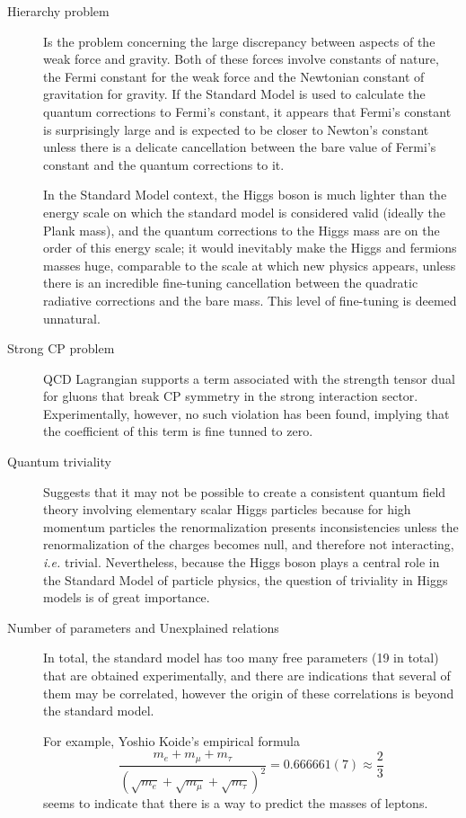 \begin{description}
	\item[Hierarchy problem] Is the problem concerning the large discrepancy between aspects of the weak force and gravity. Both of these forces involve constants of nature, the Fermi constant for the weak force and the Newtonian constant of gravitation for gravity. If the Standard Model is used to calculate the quantum corrections to Fermi's constant, it appears that Fermi's constant is surprisingly large and is expected to be closer to Newton's constant unless there is a delicate cancellation between the bare value of Fermi's constant and the quantum corrections to it. 
	
	In the Standard Model context, the Higgs boson is much lighter than the energy scale on which the standard model is considered valid (ideally the Plank mass), and the quantum corrections to the Higgs mass are on the order of this energy scale; it would inevitably make the Higgs and fermions masses huge, comparable to the scale at which new physics appears, unless there is an incredible fine-tuning cancellation between the quadratic radiative corrections and the bare mass. This level of fine-tuning is deemed unnatural.
	\item[Strong CP problem] QCD Lagrangian supports a term associated with the strength tensor dual for gluons that break CP symmetry in the strong interaction sector. Experimentally, however, no such violation has been found, implying that the coefficient of this term is fine tunned to zero. 
	\item[Quantum triviality] Suggests that it may not be possible to create a consistent quantum field theory involving elementary scalar Higgs particles because for high momentum particles the renormalization presents inconsistencies unless the renormalization of the charges becomes null, and therefore not interacting, \textit{i.e.} trivial. Nevertheless, because the Higgs boson plays a central role in the Standard Model of particle physics, the question of triviality in Higgs models is of great importance. 
	\item[Number of parameters and Unexplained relations] In total, the standard model has too many free parameters (19 in total) that are obtained experimentally, and there are indications that several of them may be correlated, however the origin of these correlations is beyond the standard model.
	
	For example, Yoshio Koide's empirical formula~\parencite{0505220}
	$$
	\frac{m_{e}+m_{\mu}+m_{\tau}}{\left(\sqrt{m_{e}}+\sqrt{m_{\mu}}+\sqrt{m_{\tau}}\right)^{2}}=0.666661(7) \approx \frac{2}{3}
	$$
	seems to indicate that there is a way to predict the masses of leptons.
	
\end{description}
